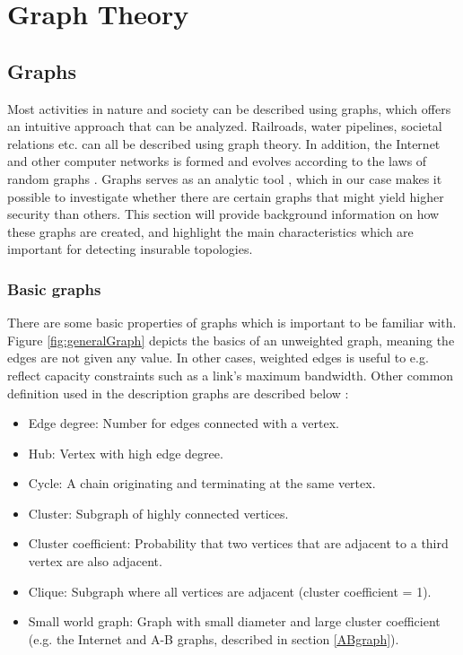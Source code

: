 \chapter{Graph Theory}
\label{chp:graphTheory} 


\section{Graphs}

Most activities in nature and society can be described using graphs, which offers an intuitive approach that can be analyzed. Railroads, water pipelines, societal relations etc. can all be described using graph theory. In addition, the Internet and other computer networks is formed and evolves according to the laws of random graphs \cite{audestad}. Graphs serves as an analytic tool \cite{audestad}, which in our case makes it possible to investigate whether there are certain graphs that might yield higher security than others. This section will provide background information on how these graphs are created, and highlight the main characteristics which are important for detecting insurable topologies. 

\subsection{Basic graphs}


There are some basic properties of graphs which is important to be familiar with. Figure \ref{fig:generalGraph} depicts the basics of an unweighted graph, meaning the edges are not given any value. In other cases, weighted edges is useful to e.g. reflect capacity constraints such as a link's maximum bandwidth. Other common definition used in the description graphs are described below \cite{audestad}:
\begin{itemize}
\item Edge degree: Number for edges connected with a vertex.
\item Hub: Vertex with high edge degree.
\item Cycle: A chain originating and terminating at the same vertex.
\item Cluster: Subgraph of highly connected vertices.
\item Cluster coefficient: Probability that two vertices that are adjacent to a third vertex are also adjacent.
\item Clique: Subgraph where all vertices are adjacent (cluster coefficient = 1).
\item Small world graph: Graph with small diameter and large cluster coefficient (e.g. the Internet and A-B graphs, described in section \ref{ABgraph}).
\end{itemize}


